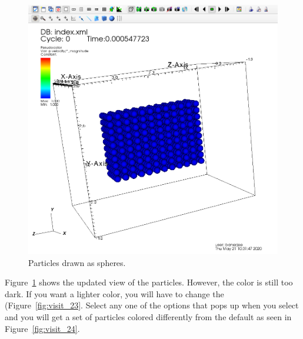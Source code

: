 \begin{paracol}{2}
  \switchcolumn

  \begin{figure}[htb!]
    \centering
    \includegraphics[width=\columnwidth]{FIGS/visit/visit_21.png}
    \caption{Particles drawn as spheres.}
    \label{fig:visit_21}
  \end{figure}

  \switchcolumn
  Figure~\ref{fig:visit_21} shows the updated view of the \MPM particles.
  However, the color is still too dark.  If you want a lighter color, you 
  will have to change the  (Figure~\ref{fig:visit_23}.
  Select any one of the options that pops up when you select 
  and you will get a set of particles colored differently from the default
  as seen in Figure~\ref{fig:visit_24}.


\end{paracol}
